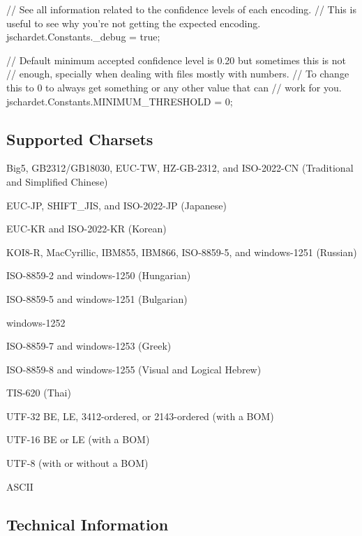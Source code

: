 \begin{DoxyCode}
// See all information related to the confidence levels of each encoding.
// This is useful to see why you're not getting the expected encoding.
jschardet.Constants.\_debug = true;

// Default minimum accepted confidence level is 0.20 but sometimes this is not
// enough, specially when dealing with files mostly with numbers.
// To change this to 0 to always get something or any other value that can
// work for you.
jschardet.Constants.MINIMUM\_THRESHOLD = 0;
\end{DoxyCode}


\subsection*{Supported Charsets }


\begin{DoxyItemize}
\item Big5, G\+B2312/\+G\+B18030, E\+U\+C-\/\+TW, H\+Z-\/\+G\+B-\/2312, and I\+S\+O-\/2022-\/\+CN (Traditional and Simplified Chinese)
\item E\+U\+C-\/\+JP, S\+H\+I\+F\+T\+\_\+\+J\+IS, and I\+S\+O-\/2022-\/\+JP (Japanese)
\item E\+U\+C-\/\+KR and I\+S\+O-\/2022-\/\+KR (Korean)
\item K\+O\+I8-\/R, Mac\+Cyrillic, I\+B\+M855, I\+B\+M866, I\+S\+O-\/8859-\/5, and windows-\/1251 (Russian)
\item I\+S\+O-\/8859-\/2 and windows-\/1250 (Hungarian)
\item I\+S\+O-\/8859-\/5 and windows-\/1251 (Bulgarian)
\item windows-\/1252
\item I\+S\+O-\/8859-\/7 and windows-\/1253 (Greek)
\item I\+S\+O-\/8859-\/8 and windows-\/1255 (Visual and Logical Hebrew)
\item T\+I\+S-\/620 (Thai)
\item U\+T\+F-\/32 BE, LE, 3412-\/ordered, or 2143-\/ordered (with a B\+OM)
\item U\+T\+F-\/16 BE or LE (with a B\+OM)
\item U\+T\+F-\/8 (with or without a B\+OM)
\item A\+S\+C\+II
\end{DoxyItemize}

\subsection*{Technical Information }


